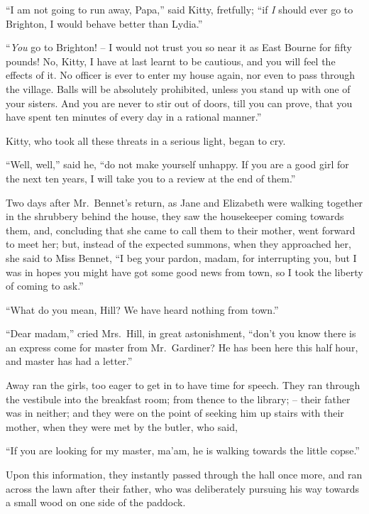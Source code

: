 “I am not going to run away, Papa,” said Kitty,
fretfully; “if \textit{I} should ever go to Brighton, I would
behave better than Lydia.”

“\textit{You} go to Brighton! -- I would not trust you so near
it as East Bourne for fifty pounds! No, Kitty, I have
at last learnt to be cautious, and you will feel the effects
of it. No officer is ever to enter my house again, nor even
to pass through the village. Balls will be absolutely
prohibited, unless you stand up with one of your sisters.
And you are never to stir out of doors, till you can prove,
that you have spent ten minutes of every day in a rational
manner.”

Kitty, who took all these threats in a serious light,
began to cry.

“Well, well,” said he, “do not make yourself unhappy.
If you are a good girl for the next ten years, I will take
you to a review at the end of them.”


Two days after Mr.\ Bennet’s return, as Jane and
Elizabeth were walking together in the shrubbery behind
the house, they saw the housekeeper coming towards
them, and, concluding that she came to call them to their
mother, went forward to meet her; but, instead of the
expected summons, when they approached her, she said
to Miss Bennet, “I beg your pardon, madam, for interrupting
you, but I was in hopes you might have got some
good news from town, so I took the liberty of coming
to ask.”

“What do you mean, Hill? We have heard nothing
from town.”

“Dear madam,” cried Mrs.\ Hill, in great astonishment,
“don’t you know there is an express come for master
from Mr.\ Gardiner? He has been here this half hour, and
master has had a letter.”

Away ran the girls, too eager to get in to have time for
speech. They ran through the vestibule into the breakfast
room; from thence to the library; -- their father was in
neither; and they were on the point of seeking him up
stairs with their mother, when they were met by the butler,
who said,

“If you are looking for my master, ma’am, he is walking
towards the little copse.”

Upon this information, they instantly passed through
the hall once more, and ran across the lawn after their
father, who was deliberately pursuing his way towards
a small wood on one side of the paddock.

